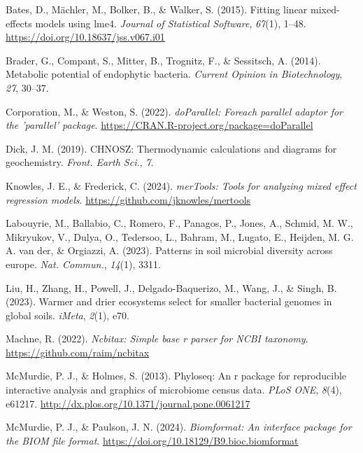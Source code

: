\documentclass[
]{article}
\newlength{\cslhangindent}
\newenvironment{CSLReferences}[2] %
 {\begin{list}{}{%
  \setlength{\itemindent}{0pt}
  \setlength{\leftmargin}{0pt}
  \setlength{\parsep}{0pt}
  \ifodd #1
   \setlength{\leftmargin}{\cslhangindent}
   \setlength{\itemindent}{-1\cslhangindent}
  \fi
  \setlength{\itemsep}{#2\baselineskip}}}
 {\end{list}}
\begin{document}
\label{refs}
\begin{CSLReferences}{1}{0}
Bates, D., Mächler, M., Bolker, B., \& Walker, S. (2015). Fitting linear
mixed-effects models using {lme4}. \emph{Journal of Statistical
Software}, \emph{67}(1), 1--48.
\url{https://doi.org/10.18637/jss.v067.i01}

Brader, G., Compant, S., Mitter, B., Trognitz, F., \& Sessitsch, A.
(2014). Metabolic potential of endophytic bacteria. \emph{Current
Opinion in Biotechnology}, \emph{27}, 30--37.

Corporation, M., \& Weston, S. (2022). \emph{doParallel: Foreach
parallel adaptor for the 'parallel' package}.
\url{https://CRAN.R-project.org/package=doParallel}

Dick, J. M. (2019). {CHNOSZ}: Thermodynamic calculations and diagrams
for geochemistry. \emph{Front. Earth Sci.}, \emph{7}.

Knowles, J. E., \& Frederick, C. (2024). \emph{merTools: Tools for
analyzing mixed effect regression models}.
\url{https://github.com/jknowles/mertools}

Labouyrie, M., Ballabio, C., Romero, F., Panagos, P., Jones, A., Schmid,
M. W., Mikryukov, V., Dulya, O., Tedersoo, L., Bahram, M., Lugato, E.,
Heijden, M. G. A. van der, \& Orgiazzi, A. (2023). Patterns in soil
microbial diversity across europe. \emph{Nat. Commun.}, \emph{14}(1),
3311.

Liu, H., Zhang, H., Powell, J., Delgado-Baquerizo, M., Wang, J., \&
Singh, B. (2023). Warmer and drier ecosystems select for smaller
bacterial genomes in global soils. \emph{iMeta}, \emph{2}(1), e70.

Machne, R. (2022). \emph{Ncbitax: Simple base r parser for NCBI
taxonomy}. \url{https://github.com/raim/ncbitax}

McMurdie, P. J., \& Holmes, S. (2013). Phyloseq: An r package for
reproducible interactive analysis and graphics of microbiome census
data. \emph{PLoS ONE}, \emph{8}(4), e61217.
\url{http://dx.plos.org/10.1371/journal.pone.0061217}

McMurdie, P. J., \& Paulson, J. N. (2024). \emph{Biomformat: An
interface package for the BIOM file format}.
\url{https://doi.org/10.18129/B9.bioc.biomformat}


\end{CSLReferences}
\end{document}
